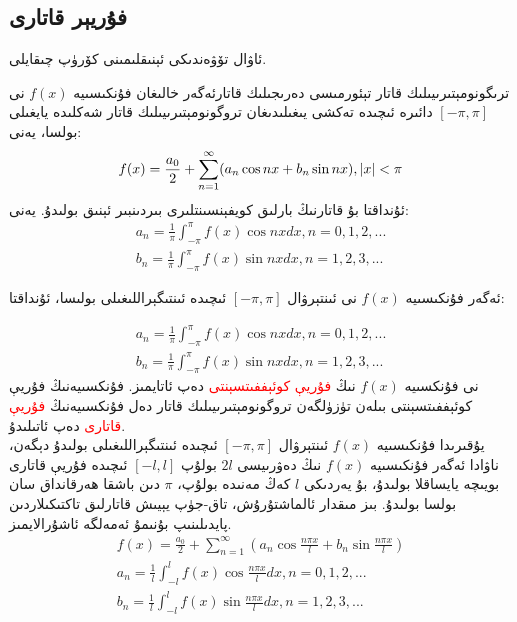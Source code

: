 \subsection{فۇريېر قاتارى}
ئاۋال تۆۋەندىكى ئېنىقلىمىنى كۆرۈپ چىقايلى.
\begin{MyTheorem}{ترىگونومېتىرىيىلىك قاتار تېئورمىسى}{}%
	دەرىجىلىك قاتارئەگەر خالىغان فۇنكىسىيە $f(x)$ نى $[-\pi,\pi]$ دائىرە ئىچىدە تەكشى يىغىلىدىغان تروگونومېتىرىيىلىك قاتار شەكلىدە يايغىلى بولسا، يەنى:
	$$
	f(x)=\frac{a_0}{2}+\sum_{n=1}^{\infty}(a_n\cos nx + b_n\sin nx), \space |x| < \pi
	$$
	ئۇنداقتا بۇ قاتارنىڭ بارلىق كويفېنسىنتلىرى بىردىنبىر ئېنىق بولىدۇ. يەنى:
	\begin{align*}
		a_n = \frac{1}{\pi} \int_{-\pi}^{\pi}f(x) \cos nx dx , n=0,1,2,... \\
		b_n = \frac{1}{\pi} \int_{-\pi}^{\pi}f(x) \sin nx dx , n=1,2,3,...
	\end{align*}
\end{MyTheorem}

ئەگەر فۇنكىسىيە $f(x)$ نى ئىنتېرۋال $[-\pi,\pi]$ ئىچىدە ئىنتىگېراللىغىلى بولىسا، ئۇنداقتا:

\begin{align*}
	a_n = \frac{1}{\pi} \int_{-\pi}^{\pi}f(x) \cos nx dx , n=0,1,2,... \\
	b_n = \frac{1}{\pi} \int_{-\pi}^{\pi}f(x) \sin nx dx , n=1,2,3,...
\end{align*}
نى فۇنكسىيە $f(x)$ نىڭ 
\textcolor{red}{فۇريې كوئېففىتسېنتى}
 دەپ ئاتايمىز. فۇنكسىيەنىڭ فۇريې كوئېففىتسېنتى بىلەن تۈزۈلگەن تروگونومېتىرىيىلىك قاتار دەل فۇنكسىيەنىڭ \textcolor{red}{فۇريې قاتارى} دەپ ئاتىلىدۇ.\\
 يۇقىرىدا فۇنكىسىيە $f(x)$ ئىنتېرۋال $[-\pi,\pi]$ ئىچىدە ئىنتىگېراللىغىلى بولىدۇ دېگەن، ناۋادا ئەگەر فۇنكىسىيە $f(x)$ نىڭ دەۋرىيسى $2l$ بولۇپ $[-l,l]$ ئىچىدە فۇريې قاتارى بويىچە يايساقلا بولىدۇ، بۇ يەردىكى $l$ كەڭ مەنىدە بولۇپ، $\pi$ دىن باشقا ھەرقانداق سان بولسا بولىدۇ. بىز مىقدار ئالماشتۇرۇش، تاق-جۈپ يېيىش قاتارلىق تاكتىكىلاردىن پايدىلىنىپ بۇنىمۇ ئەمەلگە ئاشۇرالايمىز.
 \begin{align*}
f(x)=\frac{a_0}{2}+\sum_{n=1}^{\infty}(a_n\cos \frac{n \pi x}{l} + b_n\sin \frac{n \pi x}{l}) \\
a_n = \frac{1}{l} \int_{-l}^{l}f(x) \cos \frac{n \pi x}{l} dx , n=0,1,2,... \\
b_n = \frac{1}{l} \int_{-l}^{l}f(x) \sin \frac{n \pi x}{l} dx , n=1,2,3,...
 \end{align*}

